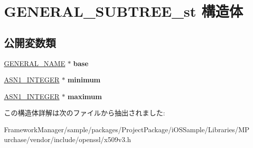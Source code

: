 \hypertarget{struct_g_e_n_e_r_a_l___s_u_b_t_r_e_e__st}{}\section{G\+E\+N\+E\+R\+A\+L\+\_\+\+S\+U\+B\+T\+R\+E\+E\+\_\+st 構造体}
\label{struct_g_e_n_e_r_a_l___s_u_b_t_r_e_e__st}
\subsection*{公開変数類}
\begin{DoxyCompactItemize}
\item 
\hypertarget{struct_g_e_n_e_r_a_l___s_u_b_t_r_e_e__st_a377ac586fdda36e7ec625fd30dce46f2}{}\hyperlink{struct_g_e_n_e_r_a_l___n_a_m_e__st}{G\+E\+N\+E\+R\+A\+L\+\_\+\+N\+A\+M\+E} $\ast$ {\bfseries base}\label{struct_g_e_n_e_r_a_l___s_u_b_t_r_e_e__st_a377ac586fdda36e7ec625fd30dce46f2}

\item 
\hypertarget{struct_g_e_n_e_r_a_l___s_u_b_t_r_e_e__st_a57dba1d7a481583e1564730497dcb672}{}\hyperlink{structasn1__string__st}{A\+S\+N1\+\_\+\+I\+N\+T\+E\+G\+E\+R} $\ast$ {\bfseries minimum}\label{struct_g_e_n_e_r_a_l___s_u_b_t_r_e_e__st_a57dba1d7a481583e1564730497dcb672}

\item 
\hypertarget{struct_g_e_n_e_r_a_l___s_u_b_t_r_e_e__st_a19f63f3012ce4f64c219de133c9ff488}{}\hyperlink{structasn1__string__st}{A\+S\+N1\+\_\+\+I\+N\+T\+E\+G\+E\+R} $\ast$ {\bfseries maximum}\label{struct_g_e_n_e_r_a_l___s_u_b_t_r_e_e__st_a19f63f3012ce4f64c219de133c9ff488}

\end{DoxyCompactItemize}


この構造体詳解は次のファイルから抽出されました\+:\begin{DoxyCompactItemize}
\item 
Framework\+Manager/sample/packages/\+Project\+Package/i\+O\+S\+Sample/\+Libraries/\+M\+Purchase/vendor/include/openssl/x509v3.\+h\end{DoxyCompactItemize}
